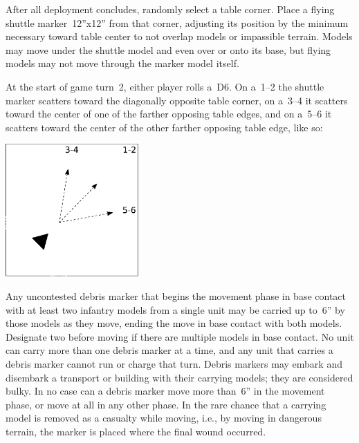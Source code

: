 
\begin{tablesetup}

  \dawnofwar

  After all deployment concludes, randomly select a table corner.
  Place a flying shuttle marker~12''x12'' from that corner, adjusting
  its position by the minimum necessary toward table center to not
  overlap models or impassible terrain.  Models may move under the
  shuttle model and even over or onto its base, but flying models may
  not move through the marker model itself.
\end{tablesetup}

\begin{missionrules}
  \nightfighting

   At the start of game turn~2,
  either player rolls a~D6.  On a~1--2 the shuttle marker scatters
  toward the diagonally opposite table corner, on a~3--4 it scatters
  toward the center of one of the farther opposing table edges, and on
  a~5--6 it scatters toward the center of the other farther opposing
  table edge, like so:

  \includegraphics[width=2in]{shuttle-scatter}

    Any uncontested debris marker that
  begins the movement phase in base contact with at least two infantry
  models from a single unit may be carried up to~6'' by those models
  as they move, ending the move in base contact with both models.
  Designate two before moving if there are multiple models in base
  contact.  No unit can carry more than one debris marker at a time,
  and any unit that carries a debris marker cannot run or charge that
  turn.  Debris markers may embark and disembark a transport or
  building with their carrying models; they are considered bulky.  In
  no case can a debris marker move more than~6'' in the movement
  phase, or move at all in any other phase.  In the rare chance that a
  carrying model is removed as a casualty while moving, i.e., by
  moving in dangerous terrain, the marker is placed where the final
  wound occurred.
\end{missionrules}



